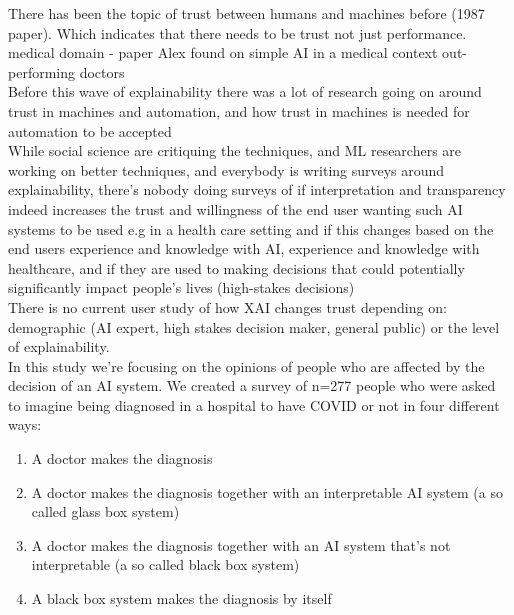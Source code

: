 \documentclass[manuscript,screen,review]{acmart}
\begin{document}
There has been the topic of trust between humans and machines before (1987 paper). Which indicates that there needs to be trust not just performance.\\
medical domain - paper Alex found on simple AI in a medical context out-performing doctors\\
Before this wave of explainability there was a lot of research going on around trust in machines and automation, and how trust in machines is needed for automation to be accepted\\ 
While social science are critiquing the techniques, and ML researchers are working on better techniques, and everybody is writing surveys around explainability, there’s nobody doing surveys of if interpretation and transparency indeed increases the trust and willingness of the end user wanting such AI systems to be used e.g in a health care setting and if this changes based on the end users experience and knowledge with AI, experience and knowledge with healthcare, and if they are used to making decisions that could potentially significantly impact people's lives (high-stakes decisions)\\
There is no current user study of how XAI changes trust depending on: demographic (AI expert, high stakes decision maker, general public) or the level of explainability.\\  

In this study we’re focusing on the opinions of people who are affected by the decision of an AI system. We created a survey of n=277 people who were asked to imagine being diagnosed in a hospital to have COVID or not in four different ways:

\begin{enumerate}
    \item A doctor makes the diagnosis
    \item A doctor makes the diagnosis together with an interpretable AI system (a so called glass box system)
    \item A doctor makes the diagnosis together with an AI system that’s not interpretable (a so called black box system)
    \item A black box system makes the diagnosis by itself
\end{enumerate}
\end{document}
